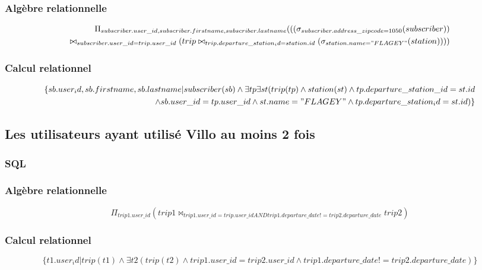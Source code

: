 \documentclass[a4paper,10pt]{article}
\begin{document}
\subsubsection{Algèbre relationnelle}
\begin{align}
\Pi_{subscriber.user\_id, subscriber.firstname, subscriber.lastname}(((\sigma_{subscriber.address\_zipcode=1050}(subscriber)) \\\bowtie_{subscriber.user\_id = trip.user\_id} (trip \bowtie_{trip.departure\_station_id = station.id} (\sigma_{station.name="FLAGEY"}(station))))
\end{align}
\subsubsection{Calcul relationnel}
\begin{align}
	\{ sb.user_id, sb.firstname, sb.lastname | subscriber(sb) \wedge \exists tp  \exists st ( trip(tp) \wedge station(st) \wedge tp.departure\_station\_id = st.id \\ \wedge sb.user\_id = tp.user\_id \wedge st.name = "FLAGEY" \wedge tp.departure\_station_id = st.id ) \}
\end{align}

\pagebreak
\subsection{Les utilisateurs ayant utilisé Villo au moins 2 fois}
\subsubsection{SQL}


\subsubsection{Algèbre relationnelle}
\begin{displaymath}
\Pi_{trip1.user\_id}( trip1 \bowtie_{trip1.user\_id = trip.user\_id AND trip1.departure\_date != trip2.departure\_date} trip2)
\end{displaymath}
\subsubsection{Calcul relationnel}
\begin{displaymath}
	\{ t1.user_id | trip(t1) \wedge \exists t2 (trip(t2) \wedge trip1.user\_id = trip2.user\_id
\wedge trip1.departure\_date != trip2.departure\_date )\}
\end{displaymath}
\end{document}
